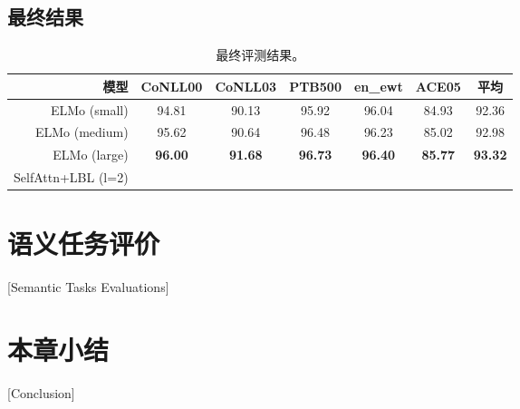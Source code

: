\subsection{最终结果}
\begin{table}[t]
	\centering
	\begin{tabular}{r cccccc}
		\hline
		模型 & CoNLL00 & CoNLL03 & PTB500 & en\_ewt & ACE05 & 平均 \\
		\hline
		ELMo (small) & 94.81 & 90.13 & 95.92 & 96.04 & 84.93 & 92.36 \\
		ELMo (medium) & 95.62 & 90.64 & 96.48 & 96.23 & 85.02 & 92.98 \\
		ELMo (large) & \bf 96.00 & \bf 91.68 & \bf 96.73 & \bf 96.40 & \bf 85.77 & \bf 93.32 \\
		\hdashline
		SelfAttn+LBL (l=2) & & & & & & \\
		\hline
	\end{tabular}
	\caption{最终评测结果。}\label{tbl:elmo:final_res}
\end{table}


\section{语义任务评价}[Semantic Tasks Evaluations]


\section{本章小结}[Conclusion]